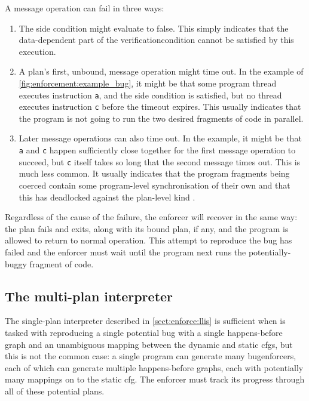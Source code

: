 A message operation can fail  in three ways:
\begin{enumerate}
\item
  The \gls{side condition} might evaluate to false.  This simply indicates
  that the data-dependent part of the \gls{verificationcondition}
  cannot be satisfied by this execution.

\item
  A plan's first, unbound, message operation might time out.  In the
  example of \autoref{fig:enforcement:example_bug}, it might be that
  some program thread executes instruction \texttt{a}, and the
  \gls{side condition} is satisfied, but no thread executes
  instruction \texttt{c} before the timeout expires.  This usually
  indicates that the program is not going to run the two desired
  fragments of code in parallel.

\item
  Later message operations can also time out.  In the example, it
  might be that \texttt{a} and \texttt{c} happen sufficiently close
  together for the first message operation to succeed, but \texttt{c}
  itself takes so long that the second message times out.  This is
  much less common.  It usually indicates that the program fragments
  being coerced contain some program-level synchronisation of their
  own and that this has deadlocked against the plan-level kind
  .
\end{enumerate}
Regardless of the cause of the failure, the enforcer will recover in
the same way: the plan fails and exits, along with its bound plan, if
any, and the program is allowed to return to normal operation.  This
attempt to reproduce the bug has failed and the enforcer must wait
until the program next runs the potentially-buggy fragment of code.

\subsection{The multi-plan interpreter}
\label{sect:enforce:succ}

The single-plan interpreter described in \autoref{sect:enforce:llis}
is sufficient when {\technique} is tasked with reproducing a single
potential bug with a single happens-before graph and an unambiguous
mapping between the dynamic and static \glspl{cfg}, but this is not
the common case: a single program can generate many
\glspl{bugenforcer}, each of which can generate multiple
happens-before graphs, each with potentially many mappings on to the
\gls{static cfg}.  The enforcer must track its progress through all of
these potential plans.

